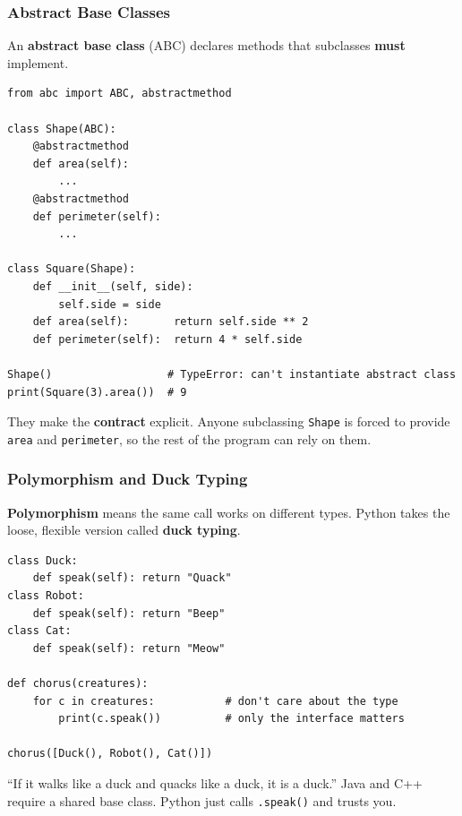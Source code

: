 \documentclass[aspectratio=169,10pt]{beamer}
\newcommand{\keyword}[1]{\textcolor{PrimaryBlue}{\textbf{#1}}}
\newcommand{\codeword}[1]{\texttt{#1}}
\newenvironment{bluebox}[1]{%
  \vspace{0.08cm}\begin{tcolorbox}[lecturebox,title={#1},fontupper=\small]%
}{\end{tcolorbox}\vspace{0.05cm}}
\begin{document}
\begin{frame}[fragile]
\frametitle{Abstract Base Classes}
\small
An \keyword{abstract base class} (ABC) declares methods that subclasses \keyword{must} implement.

\vspace{0.05cm}
\begin{lstlisting}[style=pycodesmall]
from abc import ABC, abstractmethod

class Shape(ABC):
    @abstractmethod
    def area(self):
        ...
    @abstractmethod
    def perimeter(self):
        ...

class Square(Shape):
    def __init__(self, side):
        self.side = side
    def area(self):       return self.side ** 2
    def perimeter(self):  return 4 * self.side

Shape()                  # TypeError: can't instantiate abstract class
print(Square(3).area())  # 9
\end{lstlisting}

\begin{tcolorbox}[lecturebox,title=Why use abstract classes?]
They make the \keyword{contract} explicit. Anyone subclassing \texttt{Shape} is forced to provide \codeword{area} and \codeword{perimeter}, so the rest of the program can rely on them.
\end{tcolorbox}
\end{frame}


\begin{frame}[fragile]
\frametitle{Polymorphism and Duck Typing}
\small
\keyword{Polymorphism} means the same call works on different types. Python takes the loose, flexible version called \keyword{duck typing}.

\vspace{0.12cm}
\begin{lstlisting}[style=pycode]
class Duck:
    def speak(self): return "Quack"
class Robot:
    def speak(self): return "Beep"
class Cat:
    def speak(self): return "Meow"

def chorus(creatures):
    for c in creatures:           # don't care about the type
        print(c.speak())          # only the interface matters

chorus([Duck(), Robot(), Cat()])
\end{lstlisting}

\begin{bluebox}{The Pythonic credo}
``If it walks like a duck and quacks like a duck, it is a duck.'' Java and C++ require a shared base class. Python just calls \codeword{.speak()} and trusts you.
\end{bluebox}
\end{frame}
\end{document}

